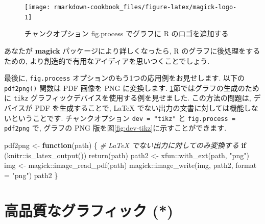 \documentclass[
  11pt,
]{bxjsreport}
\newenvironment{Shaded}{\begin{snugshade}}{\end{snugshade}}
\newcommand{\AttributeTok}[1]{\textcolor[rgb]{0.77,0.63,0.00}{#1}}
\newcommand{\CommentTok}[1]{\textcolor[rgb]{0.56,0.35,0.01}{\textit{#1}}}
\newcommand{\ControlFlowTok}[1]{\textcolor[rgb]{0.13,0.29,0.53}{\textbf{#1}}}
\newcommand{\FunctionTok}[1]{\textcolor[rgb]{0.00,0.00,0.00}{#1}}
\newcommand{\NormalTok}[1]{#1}
\newcommand{\OtherTok}[1]{\textcolor[rgb]{0.56,0.35,0.01}{#1}}
\newcommand{\SpecialCharTok}[1]{\textcolor[rgb]{0.00,0.00,0.00}{#1}}
\newcommand{\StringTok}[1]{\textcolor[rgb]{0.31,0.60,0.02}{#1}}
\begin{document}
\begin{figure}

{\centering \texttt{[image: rmarkdown-cookbook\_files/figure-latex/magick-logo-1]} 

}

\caption{チャンクオプション fig.process でグラフに R のロゴを追加する}\label{fig:magick-logo}
\end{figure}

あなたが \textbf{magick} パッケージにより詳しくなったら, R のグラフに後処理をするための, より創造的で有用なアイディアを思いつくことでしょう.

最後に, \texttt{fig.process} オプションのもう1つの応用例をお見せします. 以下の \texttt{pdf2png()} 関数は PDF 画像を PNG に変換します. \ref{graphical-device}節ではグラフの生成のために \texttt{tikz} グラフィックデバイスを使用する例を見せました. この方法の問題は, デバイスが PDF を生成することで, LaTeX でない出力の文書に対しては機能しないということです. チャンクオプション \texttt{dev = "tikz"} と \texttt{fig.process = pdf2png} で, グラフの PNG 版を図\ref{fig:dev-tikz}に示すことができます.

\begin{Shaded}
\begin{Highlighting}[numbers=left,,]
\NormalTok{pdf2png }\OtherTok{\textless{}{-}} \ControlFlowTok{function}\NormalTok{(path) \{}
  \CommentTok{\# LaTeX でない出力に対してのみ変換する}
  \ControlFlowTok{if}\NormalTok{ (knitr}\SpecialCharTok{::}\FunctionTok{is\_latex\_output}\NormalTok{()) }
    \FunctionTok{return}\NormalTok{(path)}
\NormalTok{  path2 }\OtherTok{\textless{}{-}}\NormalTok{ xfun}\SpecialCharTok{::}\FunctionTok{with\_ext}\NormalTok{(path, }\StringTok{"png"}\NormalTok{)}
\NormalTok{  img }\OtherTok{\textless{}{-}}\NormalTok{ magick}\SpecialCharTok{::}\FunctionTok{image\_read\_pdf}\NormalTok{(path)}
\NormalTok{  magick}\SpecialCharTok{::}\FunctionTok{image\_write}\NormalTok{(img, path2, }\AttributeTok{format =} \StringTok{"png"}\NormalTok{)}
\NormalTok{  path2}
\NormalTok{\}}
\end{Highlighting}
\end{Shaded}

\hypertarget{graphical-device}{%
\section{高品質なグラフィック (*)}\label{graphical-device}}
\end{document}
